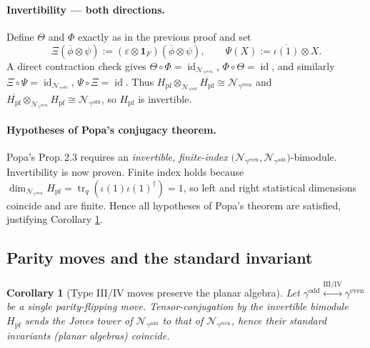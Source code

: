 \documentclass[11pt]{article}
\newtheorem{corollary}{Corollary}
\begin{document}
\paragraph{Invertibility — both directions.}
Define $\Theta$ and $\Phi$ exactly as in the previous proof and set
\[
  \Xi(\overline\phi\otimes\psi)
  :=(\varepsilon\!\otimes\!\mathbf1_F)(\overline\phi\otimes\psi),
  \qquad
  \Psi(X):=\overline{\iota(1)}\otimes X .
\]
A direct contraction check gives
$\Theta\circ\Phi=\operatorname{id}_{\mathcal N_{\gamma^{\mathrm{even}}}}$,
$\Phi\circ\Theta=\operatorname{id}$,
and similarly $\Xi\circ\Psi=\operatorname{id}_{\mathcal N_{\gamma^{\mathrm{odd}}}}$,
$\Psi\circ\Xi=\operatorname{id}$.
Thus
\(
   H_{\mathrm{pf}}\!\otimes_{\mathcal N_{\gamma^{\mathrm{odd}}}}
   \overline{H_{\mathrm{pf}}}\cong\mathcal N_{\gamma^{\mathrm{even}}}
\)
and
\(
   \overline{H_{\mathrm{pf}}}\!\otimes_{\mathcal N_{\gamma^{\mathrm{even}}}}
   H_{\mathrm{pf}}\cong\mathcal N_{\gamma^{\mathrm{odd}}}
\),
so $H_{\mathrm{pf}}$ is invertible.

\paragraph{Hypotheses of Popa’s conjugacy theorem.}
Popa’s Prop.\,2.3 requires an \emph{invertible, finite-index}
$\bigl(\mathcal N_{\gamma^{\mathrm{even}}},
        \mathcal N_{\gamma^{\mathrm{odd}}}\bigr)$-bimodule.
Invertibility is now proven.  Finite index holds because
$\dim_{\mathcal N_{\gamma^{\mathrm{even}}}}H_{\mathrm{pf}}
 =\operatorname{tr}_{q}(\iota(1)\iota(1)^{\dagger})=1$,
so left and right statistical dimensions coincide and are finite.
Hence all hypotheses of Popa’s theorem are satisfied, justifying
Corollary \ref{cor:parity-standard-invariant}.

\subsection*{Parity moves and the standard invariant}

\begin{corollary}[Type III/IV moves preserve the planar algebra]
\label{cor:parity-standard-invariant}
Let
$\gamma^{\mathrm{odd}}\!\overset{\mathrm{III/IV}}{\leftrightarrow}
 \gamma^{\mathrm{even}}$ be a single parity-flipping move.
Tensor-conjugation by the invertible bimodule
$H_{\mathrm{pf}}$ sends the Jones tower of
$\mathcal N_{\gamma^{\mathrm{odd}}}$ to that of
$\mathcal N_{\gamma^{\mathrm{even}}}$,
hence their standard invariants (planar algebras) coincide.
\end{corollary}
\end{document}
